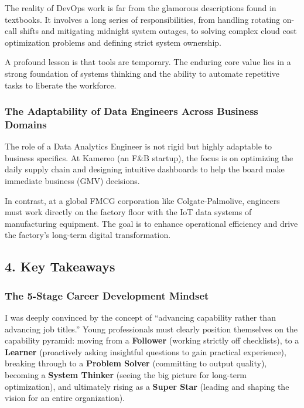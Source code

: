 The reality of DevOps work is far from the glamorous descriptions found
in textbooks. It involves a long series of responsibilities, from
handling rotating on-call shifts and mitigating midnight system outages,
to solving complex cloud cost optimization problems and defining strict
system ownership.

A profound lesson is that tools are temporary. The enduring core value
lies in a strong foundation of systems thinking and the ability to
automate repetitive tasks to liberate the workforce.

\hypertarget{the-adaptability-of-data-engineers-across-business-domains}{%
\subsubsection{The Adaptability of Data Engineers Across Business
Domains}}

The role of a Data Analytics Engineer is not rigid but highly adaptable
to business specifics. At Kamereo (an F\&B startup), the focus is on
optimizing the daily supply chain and designing intuitive dashboards to
help the board make immediate business (GMV) decisions.

In contrast, at a global FMCG corporation like Colgate-Palmolive,
engineers must work directly on the factory floor with the IoT data
systems of manufacturing equipment. The goal is to enhance operational
efficiency and drive the factory's long-term digital transformation.

\hypertarget{key-takeaways}{%
\subsection{4. Key Takeaways}}

\hypertarget{the-5-stage-career-development-mindset}{%
\subsubsection{The 5-Stage Career Development
Mindset}}

I was deeply convinced by the concept of ``advancing capability rather
than advancing job titles.'' Young professionals must clearly position
themselves on the capability pyramid: moving from a \textbf{Follower}
(working strictly off checklists), to a \textbf{Learner} (proactively
asking insightful questions to gain practical experience), breaking
through to a \textbf{Problem Solver} (committing to output quality),
becoming a \textbf{System Thinker} (seeing the big picture for long-term
optimization), and ultimately rising as a \textbf{Super Star} (leading
and shaping the vision for an entire organization).

